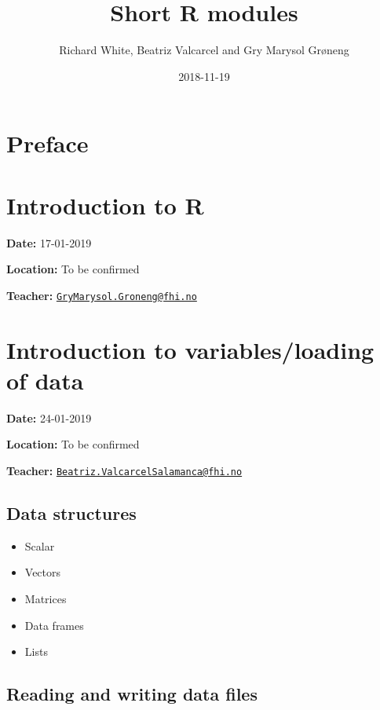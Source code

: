 \documentclass[12pt,]{article}
\title{Short R modules}
\author{Richard White, Beatriz Valcarcel and Gry Marysol Grøneng}
\date{2018-11-19}
\providecommand{\tightlist}{%
  \setlength{\itemsep}{0pt}\setlength{\parskip}{0pt}}
\begin{document}
\maketitle

{
\hypersetup{linkcolor=black}
\setcounter{tocdepth}{2}
\tableofcontents
}
\listoftables
\listoffigures
\section*{Preface}\label{preface}

\section{Introduction to R}\label{introduction-to-r}

\textbf{Date:} 17-01-2019

\textbf{Location:} To be confirmed

\textbf{Teacher:}
\href{mailto:GryMarysol.Groneng@fhi.no}{\nolinkurl{GryMarysol.Groneng@fhi.no}}

\section{Introduction to variables/loading of
data}\label{introduction-to-variablesloading-of-data}

\textbf{Date:} 24-01-2019

\textbf{Location:} To be confirmed

\textbf{Teacher:}
\href{mailto:Beatriz.ValcarcelSalamanca@fhi.no}{\nolinkurl{Beatriz.ValcarcelSalamanca@fhi.no}}

\subsection{Data structures}\label{data-structures}

\begin{itemize}
\tightlist
\item
  Scalar
\item
  Vectors
\item
  Matrices
\item
  Data frames
\item
  Lists
\end{itemize}

\subsection{Reading and writing data
files}\label{reading-and-writing-data-files}
\end{document}
